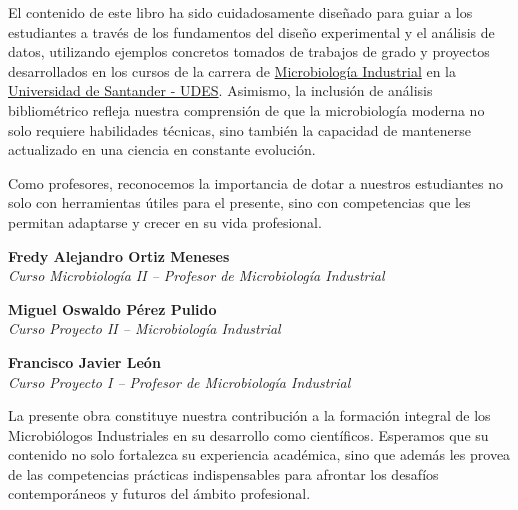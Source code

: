 \documentclass[
  letterpaper,
  DIV=11,
  numbers=noendperiod]{scrreprt}
\begin{document}
El contenido de este libro ha sido cuidadosamente diseñado para guiar a
los estudiantes a través de los fundamentos del diseño experimental y el
análisis de datos, utilizando ejemplos concretos tomados de trabajos de
grado y proyectos desarrollados en los cursos de la carrera de
\href{https://bucaramanga.udes.edu.co/estudia/pregrados/microbiologia-industrial}{Microbiología
Industrial} en la \href{https://udes.edu.co/}{Universidad de Santander -
UDES}. Asimismo, la inclusión de análisis bibliométrico refleja nuestra
comprensión de que la microbiología moderna no solo requiere habilidades
técnicas, sino también la capacidad de mantenerse actualizado en una
ciencia en constante evolución.

Como profesores, reconocemos la importancia de dotar a nuestros
estudiantes no solo con herramientas útiles para el presente, sino con
competencias que les permitan adaptarse y crecer en su vida profesional.

\textbf{Fredy Alejandro Ortiz Meneses}\\
\emph{Curso Microbiología II -- Profesor de Microbiología Industrial}

\textbf{Miguel Oswaldo Pérez Pulido}\\
\emph{Curso Proyecto II -- Microbiología Industrial}

\textbf{Francisco Javier León}\\
\emph{Curso Proyecto I -- Profesor de Microbiología Industrial}

\begin{tcolorbox}[enhanced jigsaw, toptitle=1mm, colbacktitle=quarto-callout-tip-color!10!white, breakable, opacityback=0, toprule=.15mm, coltitle=black, colframe=quarto-callout-tip-color-frame, bottomtitle=1mm, bottomrule=.15mm, titlerule=0mm, title=\textcolor{quarto-callout-tip-color}{\faLightbulb}\hspace{0.5em}{Lo que significa este libro}, colback=white, arc=.35mm, rightrule=.15mm, leftrule=.75mm, left=2mm, opacitybacktitle=0.6]

La presente obra constituye nuestra contribución a la formación integral
de los Microbiólogos Industriales en su desarrollo como científicos.
Esperamos que su contenido no solo fortalezca su experiencia académica,
sino que además les provea de las competencias prácticas indispensables
para afrontar los desafíos contemporáneos y futuros del ámbito
profesional.

\end{tcolorbox}

\end{document}
